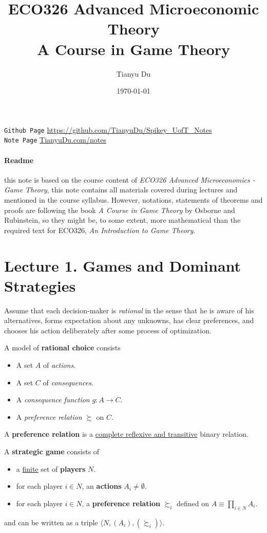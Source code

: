 \documentclass[11pt]{article}
\title{ECO326 Advanced Microeconomic Theory \\ \small A Course in Game Theory}
\author{Tianyu Du}
\date{\today}
\begin{document}
	\maketitle
	\doclicenseThis
	\texttt{Github Page} \url{https://github.com/TianyuDu/Spikey_UofT_Notes}\\
	\texttt{Note Page} \url{TianyuDu.com/notes}
	\paragraph{Readme} this note is based on the course content of \emph{ECO326 Advanced Microeconomics - Game Theory}, this note contains all materials covered during lectures and mentioned in the course syllabus. However, notations, statements of theorems and proofs are following the book \emph{A Course in Game Theory} by Osborne and Rubinstein, so they might be, to some extent, more mathematical than the required text for ECO326, \emph{An Introduction to Game Theory}.
	
	\tableofcontents
	\section{Lecture 1. Games and Dominant Strategies}
		\begin{assumption}[pg.4]
			Assume that each decision-maker is \emph{rational} in the sense that he is aware of his alternatives, forms expectation about any unknowns, has clear preferences, and chooses his action deliberately after some process of optimization.
		\end{assumption}
		
		\begin{definition}[pg.4]
			A model of \textbf{rational choice} consists
			\begin{itemize}
				\item A set $A$ of \emph{actions}.
				\item A set $C$ of \emph{consequences}.
				\item A \emph{consequence function} $g: A \to C$.
				\item A \emph{preference relation} $\succsim$ on $C$.
			\end{itemize}
		\end{definition}
		
		\begin{definition}[pg.7]
			A \textbf{preference relation} is a \ul{complete reflexive and transitive} binary relation.
		\end{definition}
\begin{definition}[11.1]
			A \textbf{strategic game} consists of
			\begin{itemize}
				\item a \ul{finite} set of \textbf{players} $N$.
				\item for each player $i \in N$, an \textbf{actions} $A_i \neq \emptyset$.
				\item for each player $i \in N$, a \textbf{preference relation} $\succsim_i$ defined on $A \equiv \prod_{i\in N}A_i$.
			\end{itemize}
			and can be written as a triple $\langle N, (A_i), (\succsim_i) \rangle$.
		\end{definition}
		
\end{document}
